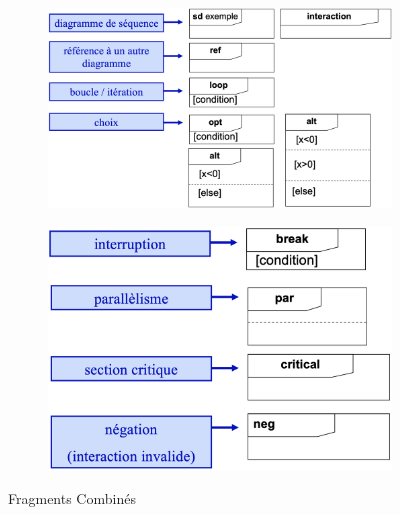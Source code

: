 \begin{figure}[H]
\centering
\begin{subfigure}{0.55\textwidth}
  \includegraphics[width=\textwidth]{./Images/Diagrammes/diagram_sequence_fragmentscombines1.png}
  \label{fig:diagram_sequence_fc1}
\end{subfigure}
\begin{subfigure}{0.4\textwidth}
  \includegraphics[width=\textwidth]{./Images/Diagrammes/diagram_sequence_fragmentscombines.png}
  \label{fig:diagram_sequence_fc2}
\end{subfigure}
\caption{Fragments Combinés}
\end{figure}

